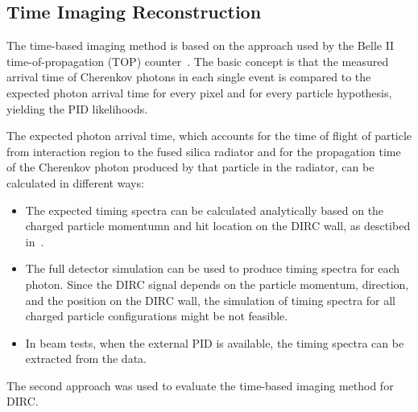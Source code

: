 \subsection{Time Imaging Reconstruction}
\label{sec:ti}

The time-based imaging method is based on the approach used by the Belle II time-of-propagation (TOP) counter~\cite{staric2}. The basic concept is that the measured arrival time of Cherenkov photons in each single event is compared to the expected photon arrival time for every pixel and for every particle hypothesis, yielding the PID likelihoods.

The expected photon arrival time, which accounts for the time of flight of particle from interaction region to the fused silica radiator and for the propagation time of the Cherenkov photon produced by that particle in the radiator, can be calculated in different ways:
\begin{itemize}
\item The expected timing spectra can be calculated analytically based on the charged particle momentumn and hit location on the DIRC wall, as desctibed in~\cite{staric2, staric3}.
\item The full detector simulation can be used to produce timing spectra for each photon. Since the DIRC signal depends on the particle momentum, direction, and the position on the DIRC wall, the simulation of timing spectra for all charged particle configurations might be not feasible.
\item In beam tests, when the external PID is available, the timing spectra can be extracted from the data.
\end{itemize}

The second approach was used to evaluate the time-based imaging method for \gluex DIRC.

